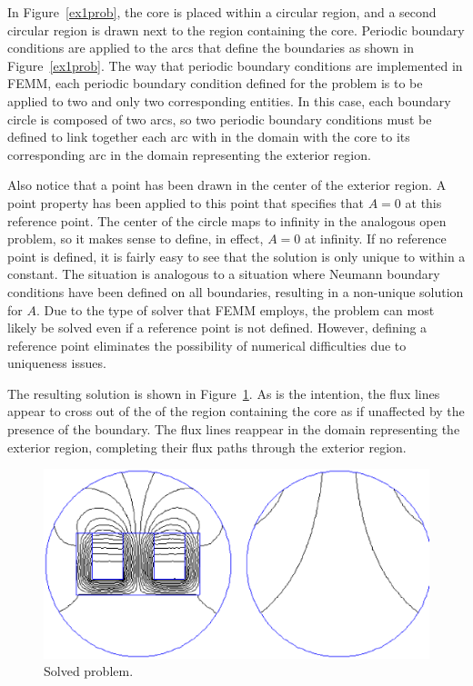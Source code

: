 \documentclass[12pt]{report}
\begin{document}
In Figure~\ref{ex1prob}, the core is placed within a circular
region, and a second circular region is drawn next to the region
containing the core.  Periodic boundary conditions are applied to
the arcs that define the boundaries as shown in
Figure~\ref{ex1prob}.  The way that periodic boundary conditions
are implemented in FEMM, each periodic boundary condition defined
for the problem is to be applied to two and only two corresponding
entities.  In this case, each boundary circle is composed of two
arcs, so two periodic boundary conditions must be defined to link
together each arc with in the domain with the core to its
corresponding arc in the domain representing the exterior region.

Also notice that a point has been drawn in the center of the
exterior region.  A point property has been applied to this point
that specifies that $A=0$ at this reference point.  The center of
the circle maps to infinity in the analogous open problem, so it
makes sense to define, in effect, $A=0$ at infinity.  If no
reference point is defined, it is fairly easy to see that the
solution is only unique to within a constant.  The situation is
analogous to a situation where Neumann boundary conditions have
been defined on all boundaries, resulting in a non-unique solution
for $A$. Due to the type of solver that FEMM employs, the problem
can most likely be solved even if a reference point is not defined.
However, defining a reference point eliminates the possibility of
numerical difficulties due to uniqueness issues.

The resulting solution is shown in Figure~\ref{ex1soln}.  As is the
intention, the flux lines appear to cross out of the of the region
containing the core as if unaffected by the presence of the
boundary.  The flux lines reappear in the domain representing the
exterior region, completing their flux paths through the exterior
region.
\begin{figure}
\centerline{\includegraphics[width=6in]{open1b.ps}}
\caption{Solved problem.}
\label{ex1soln}
\end{figure}
\end{document}
